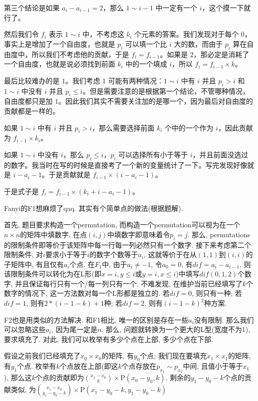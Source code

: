 第三个结论是如果 $a_i-a_{i-1}=2$，那么 $1\sim i-1$ 中一定有一个 $i$，这个摸一下就行了。

然后我们令 $f_i$ 表示 $1\sim i$ 中，不考虑这 $k_i$ 个元素的答案。我们发现对于每个 $0$，事实上是增加了一个自由度，也就是 $p_i$ 可以填一个比 $i$ 大的数，而由于 $p_i$ 算在自由度中，所以我们不考虑他的贡献，于是 $f_i=f_{i-1}$。如果是 $2$，那必定是消耗了一个自由度，也就是说必须找到前面 $k_i$ 中的一个填成 $i$，所以 $f_i=f_{i-1}\times k$。

最后比较难办的是 $1$。我们考虑 $1$ 可能有两种情况：$1\sim i$ 中有 $i$ 并且 $p_i>i$ 和 $1\sim i$ 中没有 $i$ 并且 $p_i\le i$。但是需要注意的是根据第一个结论，不管哪种情况，自由度都只是加 $1$。因此我们其实不需要关注加的是哪一个，因为最后对自由度的贡献都是一样的。

如果 $1\sim i$ 中有 $i$ 并且 $p_i>i$，那么需要选择前面 $k_i$ 个中的一个作为 $i$，因此贡献为 $f_{i-1}\times k_i$。

如果 $1\sim i$ 中没有 $i$，那么 $p_i\le i$，$p_i$ 可以选择所有小于等于 $i$，并且前面没选过的数字。我当时在写的时候是直接考了一个新的变量统计了一下。写完发现好像就是 $i-a_i-1$。于是贡献就是 $f_{i-1}\times (i - a_i - 1)$。

于是式子是 $f_i=f_{i-1}\times (k_i+i-a_i-1)$。

\sol Fanyi的F1想麻烦了qaq. 其实有个简单点的做法(根据题解). 

首先, 题目要求构造一个permutation, 而构造一个permutation可以视为在一个$n \times n$的矩阵中填数字, 在点$(i,j)$中填数字即意味着令$p_i = j$. 那么, permutations的限制条件即等价于该矩阵中每一行每一列必然只有一个数字. 接下来考虑第二个限制条件, 对$i$要求小于等于$i$的数字个数等于$a_i$, 这就等价于在从$(1,1)$到$(i,i)$的子矩阵中, 有且仅有$a_i$个点. 在$F_1$中, 由于$a_i \not = -1$, 令$a_0 = 0$, 有$dif = a_i - a_{i-1}$, 则该限制条件可以转化为在L形(即$x = i, y \leq i$或$y = i, x \leq i$)中填写$dif(0,1,2)$个数字, 并且保证每行只有一个/每一列只有一个. 不难发现, 在维护当前已经填写了$k$个数字的情况下, 这一方法数对每一个L形都是独立的. 若$dif = 0$, 则只有一种; 若$dif = 1$, 则有$2 * (i - 1 - k) + 1$种; 若$dif = 2$, 则有$(i - 1 - k)^2$种方案.

F2也是用类似的方法解决. 和F1相比, 唯一的区别是存在一些$a_i$没有限制. 那么我们可以忽略这些$a_i$, 因为尾一定是$n$. 那么, 问题就转换为一个更大的L型(宽度不为1), 要求填充了. 对此, 我们可以枚举有多少个点在上部, 多少个点在下部. 

假设之前我们已经填充了$x_0 \times x_0$的矩阵, 有$y_0$个点; 我们现在要填充$x_1 \times x_1$的矩阵, 有$y_1$个点. 枚举有$k$个点放在上部(即这$k$个点存放在$p_{x_1} \sim p_{x_2}$中间, 且值小于等于$x_1$), 那么这$k$个点的贡献即为$\binom{x_1 - x_0}{k} \times \text{P}(x_0 - y_0, k)$. 剩余的$y_1 - y_0 - k$个点的贡献类似, 为$\binom{x_1 - x_0}{y_1 - y_0 - k} \times \text{P}(x_1 - y_0 - k, y_1 - y_0 - k)$

